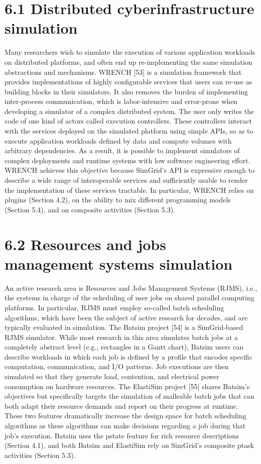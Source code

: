 \documentclass[
]{article}
\begin{document}
\section{6.1 Distributed cyberinfrastructure
simulation}\label{distributed-cyberinfrastructure-simulation}

Many researchers wish to simulate the execution of various application
workloads on distributed platforms, and often end up re-implementing the
same simulation abstractions and mechanisms. WRENCH {[}53{]} is a
simulation framework that provides implementations of highly
configurable services that users can re-use as building blocks in their
simulators. It also removes the burden of implementing inter-process
communication, which is labor-intensive and error-prone when developing
a simulator of a complex distributed system. The user only writes the
code of one kind of actors called execution controllers. These
controllers interact with the services deployed on the simulated
platform using simple APIs, so as to execute application workloads
defined by data and compute volumes with arbitrary dependencies. As a
result, it is possible to implement simulators of complex deployments
and runtime systems with low software engineering effort. WRENCH
achieves this objective because SimGrid's API is expressive enough to
describe a wide range of interoperable services and sufficiently usable
to render the implementation of these services tractable. In particular,
WRENCH relies on plugins (Section 4.2), on the ability to mix different
programming models (Section 5.4), and on composite activities (Section
5.3).

\section{6.2 Resources and jobs management systems
simulation}\label{resources-and-jobs-management-systems-simulation}

An active research area is Resources and Jobs Management Systems (RJMS),
i.e., the systems in charge of the scheduling of user jobs on shared
parallel computing platforms. In particular, RJMS must employ so-called
batch scheduling algorithms, which have been the subject of active
research for decades, and are typically evaluated in simulation. The
Batsim project {[}54{]} is a SimGrid-based RJMS simulator. While most
research in this area simulates batch jobs at a completely abstract
level (e.g., rectangles in a Gantt chart), Batsim users can describe
workloads in which each job is defined by a profile that encodes
specific computation, communication, and I/O patterns. Job executions
are then simulated so that they generate load, contention, and
electrical power consumption on hardware resources. The ElastiSim
project {[}55{]} shares Batsim's objectives but specifically targets the
simulation of malleable batch jobs that can both adapt their resource
demands and report on their progress at runtime. These two features
dramatically increase the design space for batch scheduling algorithms
as these algorithms can make decisions regarding a job during that job's
execution. Batsim uses the pstate feature for rich resource descriptions
(Section 4.1), and both Batsim and ElastiSim rely on SimGrid's composite
ptask activities (Section 5.3).
\end{document}
